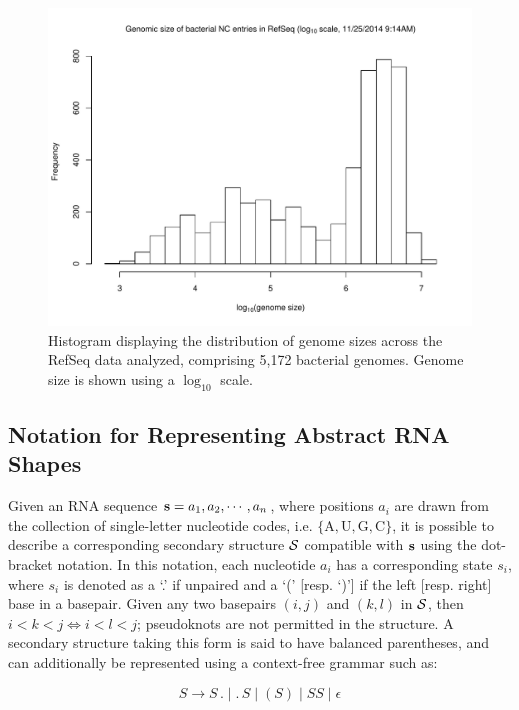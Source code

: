\begin{figure}[!ht]
  \centering
    \includegraphics[width=.75\textwidth]{Figures/Ribofinder/refseq_genome_sizes.pdf}
  \caption{Histogram displaying the distribution of genome sizes across the RefSeq data analyzed, comprising 5,172 bacterial genomes. Genome size is shown using a $\log_{10}$ scale.}
  \label{fig:genome_sizes}
\end{figure}

\subsection{Notation for Representing Abstract RNA Shapes} \label{sub:shapes}

Given an RNA sequence ${\bf s} = a_1, a_2, \cdots, a_n$, where positions $a_i$ are drawn from the collection of single-letter nucleotide codes, i.e. $\{\text{A},\text{U},\text{G},\text{C}\}$, it is possible to describe a corresponding secondary structure ${\mathcal S}$ compatible with ${\bf s}$ using the dot-bracket notation. In this notation, each nucleotide $a_i$ has a corresponding state $s_i$, where $s_i$ is denoted as a `.' if unpaired and a `(' [resp. `)'] if the left [resp. right] base in a basepair. Given any two basepairs $(i,j)$ and $(k,l)$ in ${\mathcal S}$, then $i < k < j \iff i < l < j$; pseudoknots are not permitted in the structure. A secondary structure taking this form is said to have balanced parentheses, and can additionally be represented using a context-free grammar such as:

\begin{equation} \label{eq:str_cfg}
S \rightarrow S\,.\;|\;.\,S\;|\;(S)\;|\;SS\;|\;\epsilon
\end{equation}

